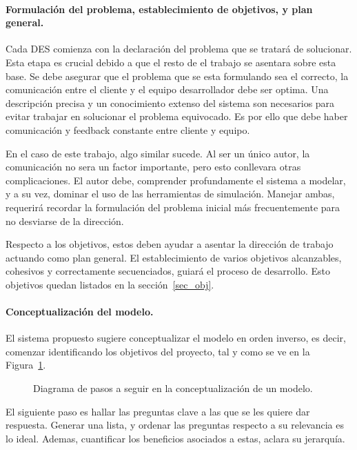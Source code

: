 \paragraph{Formulación del problema, establecimiento de objetivos, y plan general.}

Cada DES comienza con la declaración del problema que se tratará de solucionar.
Esta etapa es crucial debido a que el resto de el trabajo se asentara sobre esta base.
Se debe asegurar que el problema que se esta formulando sea el correcto,
la comunicación entre el cliente y el equipo desarrollador debe ser optima.
Una descripción precisa y un conocimiento extenso del sistema son necesarios para evitar
trabajar en solucionar el problema equivocado.
Es por ello que debe haber comunicación y feedback constante entre cliente y equipo.

En el caso de este trabajo, algo similar sucede.
Al ser un único autor, la comunicación no sera un factor importante,
pero esto conllevara otras complicaciones.
El autor debe, comprender profundamente el sistema a modelar, y a su vez,
dominar el uso de las herramientas de simulación.
Manejar ambas, requerirá recordar la formulación del problema inicial
más frecuentemente para no desviarse de la dirección.

Respecto a los objetivos, estos deben ayudar a asentar la dirección de trabajo actuando como plan general.
El establecimiento de varios objetivos alcanzables, cohesivos y correctamente secuenciados,
guiará el proceso de desarrollo.
Esto objetivos quedan listados en la sección~\ref{sec_obj}.

\paragraph{Conceptualización del modelo.}

El sistema propuesto sugiere conceptualizar el modelo en orden inverso,
es decir, comenzar identificando los objetivos del proyecto,
tal y como se ve en la Figura~\ref{fig:2_fc_model_concept}.

\begin{figure}[h]
	\begin{center}
		
	\end{center}
	\caption{Diagrama de pasos a seguir en la conceptualización de un modelo.}
	\label{fig:2_fc_model_concept}
\end{figure}

El siguiente paso es hallar las preguntas clave a las que
se les quiere dar respuesta.
Generar una lista, y ordenar las preguntas respecto a su relevancia es lo ideal.
Ademas, cuantificar los beneficios asociados a estas, aclara su jerarquía.

